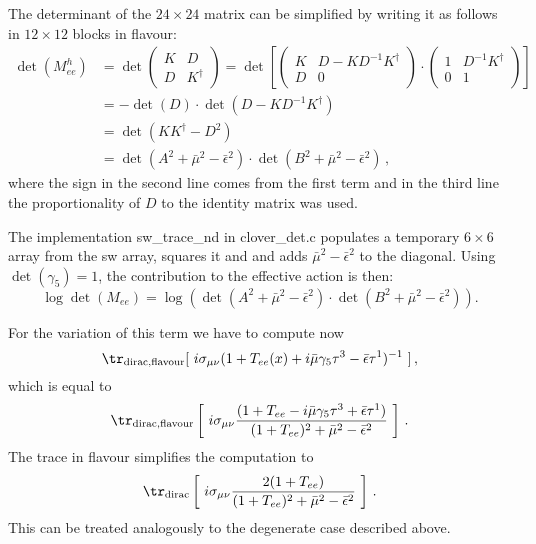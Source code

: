 The determinant of the $24 \times 24$ matrix can be simplified by writing it as follows
in $12 \times 12$ blocks in flavour:
\begin{equation*}
	\begin{aligned}
	\det(M^h_{ee}) &= 
		\det 
			\begin{pmatrix}
				K & D \\
				D & K^\dagger
			\end{pmatrix} =
			\det \left[ \begin{pmatrix}
				K & D - K D^{-1} K^\dagger \\
				D & 0
			\end{pmatrix} \cdot
			\begin{pmatrix}
				1 & D^{-1} K^\dagger \\
				0 & 1
			\end{pmatrix} \right] \\
	&= - \det(D) \cdot \det( D - K D^{-1} K^\dagger ) \\
	&= \det( K K^\dagger - D^2 ) \\
	&= \det( A^2 + \bar{\mu}^2 - \bar{\epsilon}^2 ) \cdot \det( B^2 + \bar{\mu}^2 - \bar{\epsilon}^2 ) \,,
	\end{aligned}
\end{equation*}
where the sign in the second line comes from the first term and in the third line the
proportionality of $D$ to the identity matrix was used.

The implementation {\ttfamily sw\_trace\_nd} in {\ttfamily clover\_det.c} populates
a temporary $6\times6$ array from the {\ttfamily sw} array, squares it and
and adds $\bar{\mu}^2 - \bar{\epsilon}^2$ to the diagonal. Using $\det(\gamma_5) = 1$, 
the contribution to the effective action is then:
\begin{equation}
	\label{eq:cloverdet_nd}
		\log \det(M_{ee}) = \log\left( \det( A^2 + \bar{\mu}^2 - \bar{\epsilon}^2 ) \cdot \det( B^2 + \bar{\mu}^2 - \bar{\epsilon}^2 ) \right).
\end{equation}

For the variation of this term we have to compute now
\begin{equation}
  \label{eq:ndtrdiracdet}
  \tr_\mathrm{dirac, flavour}[\ i\sigma_{\mu\nu}(1+T_{ee}(x) +
  i\bar\mu\gamma_5\tau^3 - \bar\epsilon\tau^1)^{-1}\ ]\, ,
\end{equation}
which is equal to
\begin{equation}
 \tr_\mathrm{dirac,flavour}\left[\ i\sigma_{\mu\nu}
   \frac{(1+T_{ee}-i\bar\mu\gamma_5\tau^3+\bar\epsilon\tau^1)}
  {(1+T_{ee})^2 + \bar\mu^2 - \bar\epsilon^2}\ \right]\,.
\end{equation}
The trace in flavour simplifies the computation to
\begin{equation}
 \tr_\mathrm{dirac}\left[\ i\sigma_{\mu\nu}
   \frac{2(1+T_{ee})}
  {(1+T_{ee})^2 + \bar\mu^2 - \bar\epsilon^2}\ \right]\,.
\end{equation}
This can be treated analogously to the degenerate case described
above.

